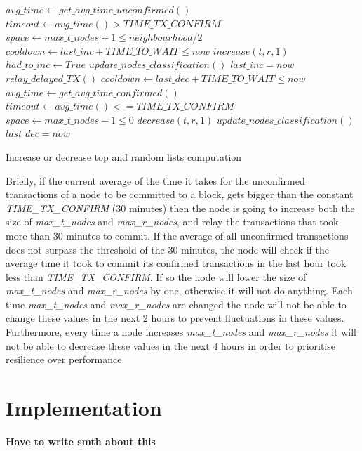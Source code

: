 \begin{algorithm}[t]
\begin{algorithmic}[1]
\State $avg\_time \gets get\_avg\_time\_unconfirmed()$
\State $timeout \gets avg\_time() > TIME\_TX\_CONFIRM$
\State $space \gets max\_t\_nodes + 1 \leq neighbourhood / 2$
\State $cooldown \gets last\_inc + TIME\_TO\_WAIT \leq now$
  \State $increase(t, r, 1)$
  \State $had\_to\_inc \gets True$
  \State $update\_nodes\_classification()$
  \State $last\_inc = now$
  \State $relay\_delayed\_TX()$
\EndIf
\State $cooldown \gets last\_dec + TIME\_TO\_WAIT \leq now$
  \State $avg\_time \gets get\_avg\_time\_confirmed()$
  \State $timeout \gets avg\_time() <= TIME\_TX\_CONFIRM$
  \State $space \gets max\_t\_nodes - 1 \leq 0$
    \State $decrease(t, r, 1)$
    \State $update\_nodes\_classification()$
    \State $last\_dec = now$
  \EndIf
\EndIf
\EndFunction
\end{algorithmic}
\caption{Increase or decrease top and random lists computation}
\label{alg:inc}
\end{algorithm}

Briefly, if the current average of the time it takes for the unconfirmed transactions of a node to be committed to a block, gets bigger than the constant \textsl{TIME\_TX\_CONFIRM} (30 minutes) then the node is going to increase both the size of \textsl{max\_t\_nodes} and \textsl{max\_r\_nodes}, and relay the transactions that took more than 30 minutes to commit.
If the average of all unconfirmed transactions does not surpass the threshold of the 30 minutes, the node will check if the average time it took to commit its confirmed transactions in the last hour took less than \textsl{TIME\_TX\_CONFIRM}. If so the node will lower the size of \textsl{max\_t\_nodes} and \textsl{max\_r\_nodes} by one, otherwise it will not do anything. Each time \textsl{max\_t\_nodes} and \textsl{max\_r\_nodes} are changed the node will not be able to change these values in the next 2 hours to prevent fluctuations in these values. Furthermore, every time a node increases \textsl{max\_t\_nodes} and \textsl{max\_r\_nodes} it will not be able to decrease these values in the next 4 hours in order to prioritise resilience over performance.

\section{Implementation}
\textbf{Have to write smth about this}
